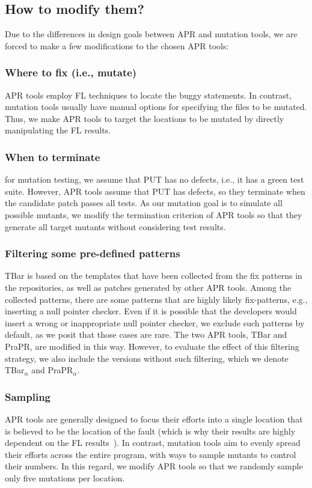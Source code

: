 \documentclass[conference]{IEEEtran}
\begin{document}
\subsection{How to modify them?}
\label{sec:RQ3_how_to_modify}

Due to the differences in design goals between APR and mutation tools,
we are forced to make a few modifications to the chosen APR tools:

\subsubsection{Where to fix (i.e., mutate)}
APR tools employ FL techniques to locate the buggy statements. In contrast,
mutation tools usually have manual options for specifying the files to be
mutated. Thus, we make APR tools to target the locations to be mutated by
directly manipulating the FL results.

\subsubsection{When to terminate}
for mutation testing, we assume that PUT has 
no defects, i.e., it has a green test suite. However, APR tools assume that PUT 
has defects, so they terminate when the candidate patch passes all tests. As 
our mutation goal is to simulate all possible mutants, we modify the 
termination criterion of APR tools so that they generate all target mutants 
without considering test results.

\subsubsection{Filtering some pre-defined patterns}
TBar is
based on the templates that have been collected from the fix patterns in the
repositories, as well as patches generated by other APR tools. Among the 
collected patterns, there are some patterns that are highly likely 
fix-patterns, e.g., inserting a null pointer checker. Even if it is possible that 
the developers would insert a wrong or inappropriate null pointer checker, we 
exclude such patterns by default, as we posit that those cases are rare. The 
two APR tools, TBar and PraPR, are modified in this way. However, to evaluate the 
effect of this filtering strategy, we also include the versions without such 
filtering, which we denote TBar$_{\alpha}$ and PraPR$_{\alpha}$.

\subsubsection{Sampling}
APR tools are generally designed to focus their efforts into a single location 
that is believed to be the location of the fault (which is why their results 
are highly dependent on the FL results~\cite{liu2019you}). In contrast, 
mutation tools aim to evenly spread their efforts across the entire program, 
with ways to sample mutants to control their numbers. In this regard, we modify 
APR tools so that we randomly sample only five mutations per location.
\end{document}
